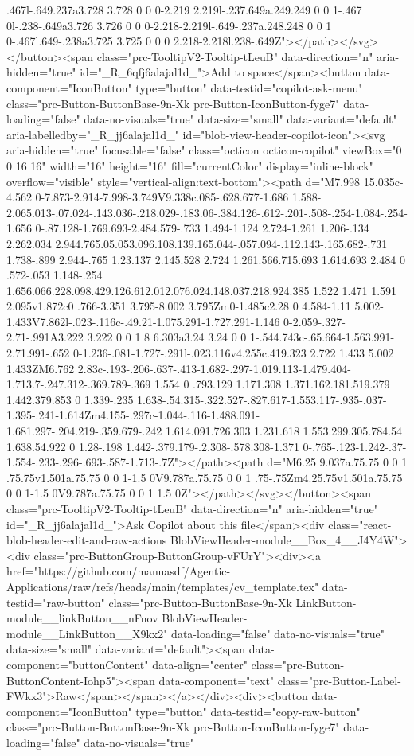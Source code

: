 {{{{{{{.467l-.649.237a3.728 3.728 0 0 0-2.219 2.219l-.237.649a.249.249 0 0 1-.467 0l-.238-.649a3.726 3.726 0 0 0-2.218-2.219l-.649-.237a.248.248 0 0 1 0-.467l.649-.238a3.725 3.725 0 0 0 2.218-2.218l.238-.649Z"></path></svg></button><span class="prc-TooltipV2-Tooltip-tLeuB" data-direction="n" aria-hidden="true" id="_R_6qfj6alajal1d_">Add to space</span><button data-component="IconButton" type="button" data-testid="copilot-ask-menu" class="prc-Button-ButtonBase-9n-Xk prc-Button-IconButton-fyge7" data-loading="false" data-no-visuals="true" data-size="small" data-variant="default" aria-labelledby="_R_jj6alajal1d_" id="blob-view-header-copilot-icon"><svg aria-hidden="true" focusable="false" class="octicon octicon-copilot" viewBox="0 0 16 16" width="16" height="16" fill="currentColor" display="inline-block" overflow="visible" style="vertical-align:text-bottom"><path d="M7.998 15.035c-4.562 0-7.873-2.914-7.998-3.749V9.338c.085-.628.677-1.686 1.588-2.065.013-.07.024-.143.036-.218.029-.183.06-.384.126-.612-.201-.508-.254-1.084-.254-1.656 0-.87.128-1.769.693-2.484.579-.733 1.494-1.124 2.724-1.261 1.206-.134 2.262.034 2.944.765.05.053.096.108.139.165.044-.057.094-.112.143-.165.682-.731 1.738-.899 2.944-.765 1.23.137 2.145.528 2.724 1.261.566.715.693 1.614.693 2.484 0 .572-.053 1.148-.254 1.656.066.228.098.429.126.612.012.076.024.148.037.218.924.385 1.522 1.471 1.591 2.095v1.872c0 .766-3.351 3.795-8.002 3.795Zm0-1.485c2.28 0 4.584-1.11 5.002-1.433V7.862l-.023-.116c-.49.21-1.075.291-1.727.291-1.146 0-2.059-.327-2.71-.991A3.222 3.222 0 0 1 8 6.303a3.24 3.24 0 0 1-.544.743c-.65.664-1.563.991-2.71.991-.652 0-1.236-.081-1.727-.291l-.023.116v4.255c.419.323 2.722 1.433 5.002 1.433ZM6.762 2.83c-.193-.206-.637-.413-1.682-.297-1.019.113-1.479.404-1.713.7-.247.312-.369.789-.369 1.554 0 .793.129 1.171.308 1.371.162.181.519.379 1.442.379.853 0 1.339-.235 1.638-.54.315-.322.527-.827.617-1.553.117-.935-.037-1.395-.241-1.614Zm4.155-.297c-1.044-.116-1.488.091-1.681.297-.204.219-.359.679-.242 1.614.091.726.303 1.231.618 1.553.299.305.784.54 1.638.54.922 0 1.28-.198 1.442-.379.179-.2.308-.578.308-1.371 0-.765-.123-1.242-.37-1.554-.233-.296-.693-.587-1.713-.7Z"></path><path d="M6.25 9.037a.75.75 0 0 1 .75.75v1.501a.75.75 0 0 1-1.5 0V9.787a.75.75 0 0 1 .75-.75Zm4.25.75v1.501a.75.75 0 0 1-1.5 0V9.787a.75.75 0 0 1 1.5 0Z"></path></svg></button><span class="prc-TooltipV2-Tooltip-tLeuB" data-direction="n" aria-hidden="true" id="_R_jj6alajal1d_">Ask Copilot about this file</span><div class="react-blob-header-edit-and-raw-actions BlobViewHeader-module__Box_4__J4Y4W"><div class="prc-ButtonGroup-ButtonGroup-vFUrY"><div><a href="https://github.com/manuasdf/Agentic-Applications/raw/refs/heads/main/templates/cv_template.tex" data-testid="raw-button" class="prc-Button-ButtonBase-9n-Xk LinkButton-module__linkButton__nFnov BlobViewHeader-module__LinkButton__X9kx2" data-loading="false" data-no-visuals="true" data-size="small" data-variant="default"><span data-component="buttonContent" data-align="center" class="prc-Button-ButtonContent-Iohp5"><span data-component="text" class="prc-Button-Label-FWkx3">Raw</span></span></a></div><div><button data-component="IconButton" type="button" data-testid="copy-raw-button" class="prc-Button-ButtonBase-9n-Xk prc-Button-IconButton-fyge7" data-loading="false" data-no-visuals="true" }}}}}}}
